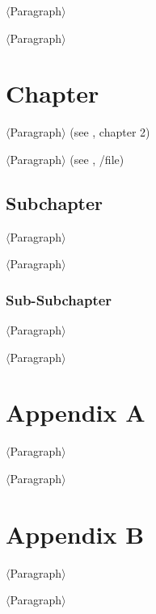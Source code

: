 \documentclass{scrartcl}
\begin{document}
\noindent $\langle$Paragraph$\rangle$

\vspace{10pt}
\noindent $\langle$Paragraph$\rangle$

\section{Chapter}

\noindent $\langle$Paragraph$\rangle$ (see \cite{bookRef1}, chapter 2)

\vspace{10pt}
\noindent $\langle$Paragraph$\rangle$ (see \cite{websiteRef1}, /file)

\subsection{Subchapter}

\noindent $\langle$Paragraph$\rangle$

\vspace{10pt}
\noindent $\langle$Paragraph$\rangle$

\subsubsection{Sub-Subchapter}

\noindent $\langle$Paragraph$\rangle$

\vspace{10pt}
\noindent $\langle$Paragraph$\rangle$

\section*{Appendix A}

\noindent $\langle$Paragraph$\rangle$

\vspace{10pt}
\noindent $\langle$Paragraph$\rangle$

\section*{Appendix B}

\noindent $\langle$Paragraph$\rangle$

\vspace{10pt}
\noindent $\langle$Paragraph$\rangle$



\end{document}
